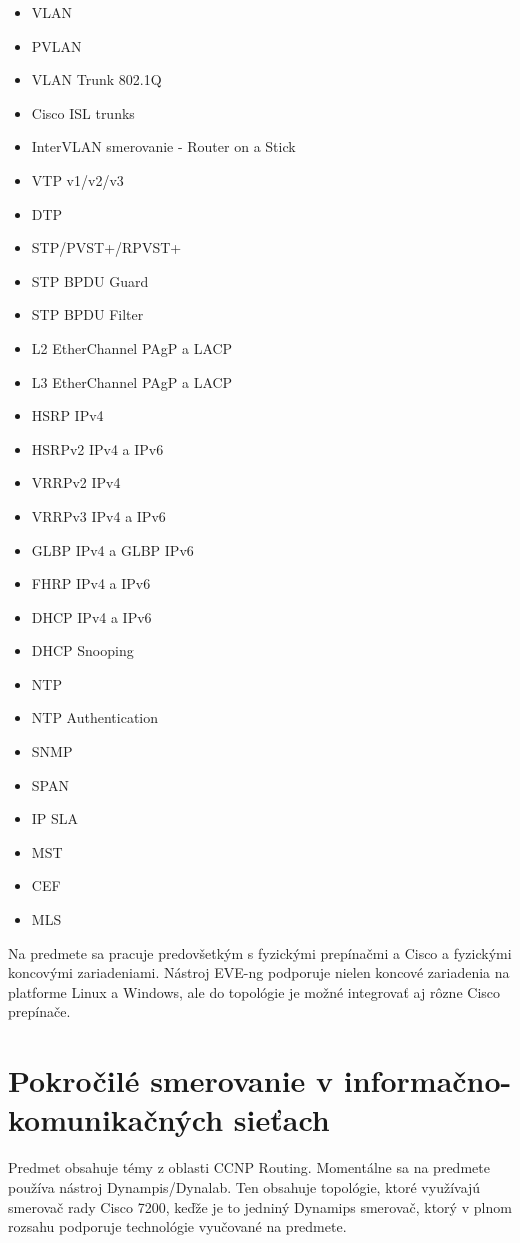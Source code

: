 \begin{itemize}[noitemsep]
    \item VLAN
    \item PVLAN
    \item VLAN Trunk 802.1Q
    \item Cisco ISL trunks
    \item InterVLAN smerovanie - Router on a Stick
    \item VTP v1/v2/v3
    \item DTP
    \item STP/PVST+/RPVST+
    \item STP BPDU Guard
    \item STP BPDU Filter
    \item L2 EtherChannel PAgP a LACP
    \item L3 EtherChannel PAgP a LACP
    \item HSRP IPv4 
    \item HSRPv2 IPv4 a IPv6 
    \item VRRPv2 IPv4 
    \item VRRPv3 IPv4 a IPv6 
    \item GLBP IPv4 a GLBP IPv6 
    \item FHRP IPv4 a IPv6 
    \item DHCP IPv4 a IPv6 
    \item DHCP Snooping
    \item NTP
    \item NTP Authentication
    \item SNMP
    \item SPAN
    \item IP SLA
    \item MST
    \item CEF
    \item MLS
\end{itemize}

Na predmete sa pracuje predovšetkým s fyzickými prepínačmi a Cisco a fyzickými koncovými zariadeniami. Nástroj EVE-ng podporuje nielen koncové zariadenia na platforme Linux a Windows, ale do topológie je možné integrovať aj rôzne Cisco prepínače.





\section{Pokročilé smerovanie v informačno-komunikačných sieťach}

Predmet obsahuje témy z oblasti CCNP Routing. Momentálne sa na predmete používa nástroj Dynampis/Dynalab. Ten obsahuje topológie, ktoré využívajú smerovač rady Cisco 7200, keďže je to jedniný Dynamips smerovač, ktorý v plnom rozsahu podporuje technológie vyučované na predmete.

